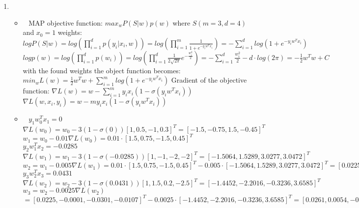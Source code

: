 \documentclass[12pt, fullpage,letterpaper]{article}
\begin{document}
\begin{enumerate}
	\item~
	\begin{itemize}
		\item~
		\newline MAP objective function: $max_wP(S|w)p(w)$ where $S(m=3, d=4)$ and $x_0=1$
		\newline weights:
		\newline $log P(S|w)= log(\prod^d_{i=1}p(y_i|x_i, w))=log(\prod^m_{i=1}\frac{1}{1+e^{-y_iw^Tx_i}}) = -\sum^d_{i=1}log(1+e^{-y_iw^Tx_i})$
		\newline
		\newline $log p(w)=log(\prod^d_{i=1}p(w_i)) = log(\prod^d_{i=1}\frac{1}{2\sqrt{2\pi}}e^{-\frac{w^2_i}{2}})=-\sum^d_{i=1}\frac{w^2_i}{2}-d\cdot log(2\pi)=-\frac{1}{2}w^Tw+C$
		\newline with the found weights the object function becomes:
		\newline $min_w L(w)=\frac{1}{2}w^Tw+\sum^m_{i=1}log(1+e^{-y_iw^Tx_i})$
		\newline Gradient of the objective function:
		\newline $\nabla L(w)=w-\sum^m_{i=1}y_ix_i(1-\sigma(y_iw^Tx_i))$
		\newline $\nabla L(w, x_i, y_i)=w-my_ix_i(1-\sigma(y_iw^Tx_i))$


		\item~ 
		\newline $y_1w^T_0x_1=0$
		\newline $\nabla L(w_0)=w_0-3(1-\sigma(0))[1,0.5,-1,0.3]^T=[-1.5,-0.75,1.5,-0.45]^T$
		\newline $w_1 = w_0-0.01\nabla L(w_0)=0.01\cdot[1.5,0.75,-1.5,0.45]^T$
		\newline $y_2w^T_1x_2=-0.0285$
		\newline $\nabla L(w_1)=w_1-3(1-\sigma(-0.0285))[1,-1,-2,-2]^T=[-1.5064,1.5289,3.0277,3.0472]^T$
		\newline $w_2=w_1-0.005\nabla L(w_1) = 0.01\cdot[1.5,0.75,-1.5,0.45]^T-0.005\cdot[-1.5064,1.5289,3.0277,3.0472]^T=[0.0225,-0.0001,-0.0301,-0.107]^T$
		\newline $y_3w^T_2x_3=0.0431$
		\newline $\nabla L(w_2)=w_2-3(1-\sigma(0.0431))[1,1.5,0.2,-2.5]^T=[-1.4452,-2.2016,-0.3236,3.6585]^T$
		\newline $w_3=w_2-0.0025\nabla L(w_2)$
		\newline $=[0.0225,-0.0001,-0.0301,-0.0107]^T-0.0025\cdot[-1.4452,-2.2016,-0.3236,3.6585]^T=[0.0261,0.0054,-0.0293,-0.0198]^T$

	\end{itemize}
	
\end{enumerate}
\end{document}
